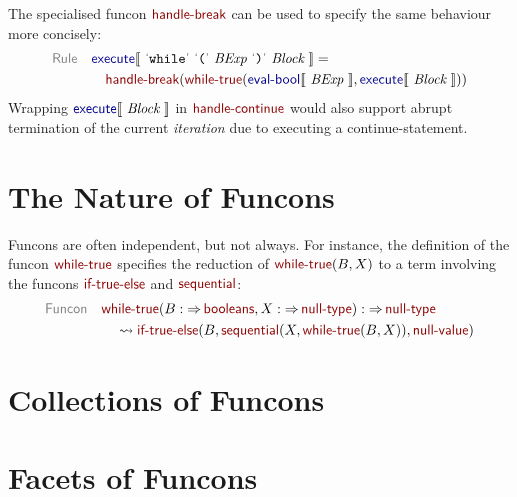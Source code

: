 \documentclass[runningheads,fleqn]{llncs}
\begin{document}
The specialised funcon $\NAME{handle-break}$ can be used
to specify the same behaviour more concisely:
%
\begin{align*}
  \KEY{Rule} \quad
    & \SEM{execute} \LEFTPHRASE \
        \LEX{while} \ \LEX{(} \ \VAR{BExp} \ \LEX{)} \ \VAR{Block} \ \RIGHTPHRASE  = \\&\quad
      \NAME{handle-break}
        (  %
        \NAME{while-true}
            (  \SEM{eval-bool} \LEFTPHRASE \ \VAR{BExp} \ \RIGHTPHRASE , 
               \SEM{execute} \LEFTPHRASE \ \VAR{Block} \ \RIGHTPHRASE  ))
\end{align*}
%
Wrapping $ \SEM{execute} \LEFTPHRASE \ \VAR{Block} \ \RIGHTPHRASE$ in $\NAME{handle-continue}$ 
would also support abrupt termination of the current \emph{iteration} due to executing a continue-statement.


\section{The Nature of Funcons}
\label{sec:funcons}

Funcons are often independent, but not always.
For instance, the definition of the funcon $\NAME{while-true}$
specifies the reduction of $\NAME{while-true}(B, X)$ to
a term involving the funcons $\NAME{if-true-else}$ and $\NAME{sequential}$:
%
\begin{align*}
  \KEY{Funcon} \quad
  & \NAME{while-true}(
                       B :  \TO \NAME{booleans}, X :  \TO \NAME{null-type}) 
    :  \TO \NAME{null-type} \\&\quad
    \leadsto \NAME{if-true-else}
               (  B, 
                      \NAME{sequential}
                       (  X, 
                              \NAME{while-true}
                               (  B, 
                                      X ) ), 
                      \NAME{null-value} )
\end{align*}
%


\section{Collections of Funcons}
\label{sec:collections}



\section{Facets of Funcons}
\label{sec:facets}
\end{document}
